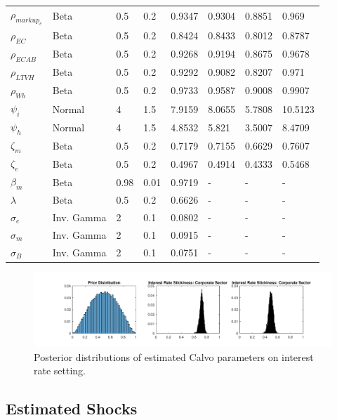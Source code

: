 \documentclass[12pt]{article}
\numberwithin{equation}{section}
\begin{document}
\begin{table}[H]
\begin{tabular}{l||lll|llll}
$\rho_{markup_e}$ & Beta & 0.5 & 0.2 &0.9347 & 0.9304 & 0.8851 & 0.969 \\
$\rho_{EC}$ & Beta & 0.5 & 0.2 & 0.8424 & 0.8433 & 0.8012 & 0.8787 \\
$\rho_{ECAB}$ &Beta & 0.5 & 0.2 &0.9268 & 0.9194 & 0.8675 & 0.9678 \\
$\rho_{LTVH}$ & Beta & 0.5 & 0.2 & 0.9292 & 0.9082 & 0.8207 & 0.971 \\
$\rho_{Wb}$ & Beta & 0.5 & 0.2 & 0.9733 & 0.9587 & 0.9008 & 0.9907 \\
\hline
$\psi_i$ &    Normal   &  4   & 1.5  & 7.9159 & 8.0655 & 5.7808 & 10.5123 \\
$\psi_h$ &    Normal   &  4   & 1.5  & 4.8532 & 5.821 & 3.5007 & 8.4709 \\
$\zeta_m$ & Beta & 0.5 & 0.2 & 0.7179 & 0.7155 & 0.6629 & 0.7607 \\
$\zeta_e$ & Beta & 0.5 & 0.2 & 0.4967 & 0.4914 & 0.4333 & 0.5468 \\
\hline
$\beta_m$ & Beta   &  0.98   & 0.01  & 0.9719 & - & - & - \\
$\lambda$ & Beta    &   0.5  &   0.2  & 0.6626 & - & - & - \\
$\sigma_e$  & Inv. Gamma & 2 & 0.1 & 0.0802 & - & - & - \\
$\sigma_m$ & Inv. Gamma & 2 & 0.1  & 0.0915 & - & - & - \\
$\sigma_B$ & Inv. Gamma & 2 & 0.1  & 0.0751 & - & - & - \\

\end{tabular}
\end{table}




\begin{figure}[H]
\centering
\caption{Posterior distributions of estimated Calvo parameters on interest rate setting.}
\label{post_calvo}
\includegraphics[scale=0.65]{posteriordistributions_calvo2.pdf}
\end{figure}

\FloatBarrier

\subsection{Estimated Shocks}
\end{document}

